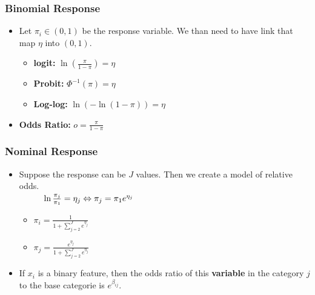 \documentclass[10pt, french]{article}
\begin{document}
\begin{multicols*}{3}
\subsubsection*{Binomial Response}
\begin{itemize}[align=left,leftmargin=*]
  \item Let $\pi_i\in(0,1)$  be the response variable. We than need to have link that map $\eta$ into $(0,1)$.
  \begin{itemize}
    \item \textbf{logit:} $ \ln\left(\frac{\pi}{1-\pi}\right) = \eta$
    \item \textbf{Probit:} $ \Phi^{-1}(\pi) = \eta$
    \item \textbf{Log-log:} $\ln(-\ln(1-\pi)) = \eta$
  \end{itemize}
  \item \textbf{Odds Ratio:} $o = \frac{\pi}{1 - \pi}$
\end{itemize}
\subsubsection*{Nominal Response}
\begin{itemize}[align=left,leftmargin=*]
  \item Suppose the response can be $J$ values. Then we create a model of relative odds. \\
  $\hspace*{1cm}\ln \frac{\pi_j}{\pi_1} = \eta_j \Leftrightarrow \pi_j = \pi_1e^{\eta_j}$
  \begin{itemize}
    \item $\pi_i = \frac{1}{1 + \sum_{j=2}^J e^{\eta_j}}$
    \item $\pi_j = \frac{e^{\eta_j}}{1 + \sum_{j=2}^J e^{\eta_j}}$
  \end{itemize}
  \item If $x_i$ is a binary feature, then the odds ratio of this \textbf{variable} in the category $j$ to the base categorie is $e^{\beta_{ij}}$.
\end{itemize}

\end{multicols*}
\end{document}
